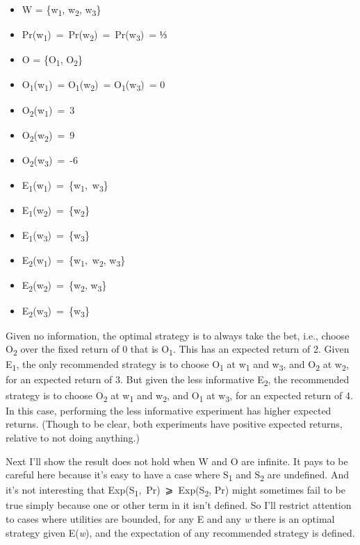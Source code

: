 \documentclass[
  11pt,
  letterpaper,
  DIV=11,
  numbers=noendperiod,
  twoside]{scrartcl}
\providecommand{\tightlist}{%
  \setlength{\itemsep}{0pt}\setlength{\parskip}{0pt}}
\begin{document}
\begin{itemize}
\tightlist
\item
  W = \{w\textsubscript{1}, w\textsubscript{2}, w\textsubscript{3}\}
\item
  Pr(w\textsubscript{1})~=~Pr(w\textsubscript{2})~=~Pr(w\textsubscript{3})~=
  ⅓
\item
  O = \{O\textsubscript{1}, O\textsubscript{2}\}
\item
  O\textsubscript{1}(w\textsubscript{1})~=
  O\textsubscript{1}(w\textsubscript{2})~=
  O\textsubscript{1}(w\textsubscript{3})~= 0
\item
  O\textsubscript{2}(w\textsubscript{1})~=~3
\item
  O\textsubscript{2}(w\textsubscript{2})~=~9
\item
  O\textsubscript{2}(w\textsubscript{3})~=~-6
\item
  E\textsubscript{1}(w\textsubscript{1})~=~\{w\textsubscript{1},~w\textsubscript{3}\}
\item
  E\textsubscript{1}(w\textsubscript{2})~=~\{w\textsubscript{2}\}
\item
  E\textsubscript{1}(w\textsubscript{3})~=~\{w\textsubscript{3}\}
\item
  E\textsubscript{2}(w\textsubscript{1})~=~\{w\textsubscript{1},~w\textsubscript{2},
  w\textsubscript{3}\}
\item
  E\textsubscript{2}(w\textsubscript{2})~=~\{w\textsubscript{2},
  w\textsubscript{3}\}
\item
  E\textsubscript{2}(w\textsubscript{3})~=~\{w\textsubscript{3}\}
\end{itemize}

Given no information, the optimal strategy is to always take the bet,
i.e., choose O\textsubscript{2} over the fixed return of 0 that is
O\textsubscript{1}. This has an expected return of 2. Given
E\textsubscript{1}, the only recommended strategy is to choose
O\textsubscript{1} at w\textsubscript{1} and w\textsubscript{3}, and
O\textsubscript{2} at w\textsubscript{2}, for an expected return of 3.
But given the less informative E\textsubscript{2}, the recommended
strategy is to choose O\textsubscript{2} at w\textsubscript{1} and
w\textsubscript{2}, and O\textsubscript{1} at w\textsubscript{3}, for an
expected return of 4. In this case, performing the less informative
experiment has higher expected returns. (Though to be clear, both
experiments have positive expected returns, relative to not doing
anything.)

Next I'll show the result does not hold when W and O are infinite. It
pays to be careful here because it's easy to have a case where
S\textsubscript{1} and S\textsubscript{2} are undefined. And it's not
interesting that Exp(S\textsubscript{1},~Pr)~⩾~Exp(S\textsubscript{2},
Pr) might sometimes fail to be true simply because one or other term in
it isn't defined. So I'll restrict attention to cases where utilities
are bounded, for any E and any \emph{w} there is an optimal strategy
given E(\emph{w}), and the expectation of any recommended strategy is
defined.
\end{document}
